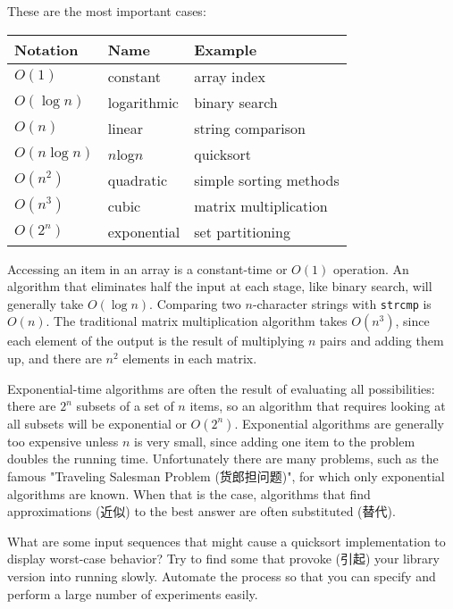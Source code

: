 These are the most important cases:
\begin{center}
\begin{tabular}{lll}
Notation        & Name          & Example                   \\
\hline
$O(1)$          & constant      & array index               \\
$O(\log n)$     & logarithmic   & binary search             \\
$O(n)$          & linear        & string comparison         \\
$O(n\log n)$    & $n$log$n$     & quicksort                 \\
$O(n^2)$        & quadratic     & simple sorting methods    \\
$O(n^3)$        & cubic         & matrix multiplication     \\
$O(2^n)$        & exponential   & set partitioning
\end{tabular}
\end{center}

Accessing an item in an array is a constant-time or $O(1)$ operation. An
algorithm that eliminates half the input at each stage, like binary search,
will generally take $O(\log n)$. Comparing two $n$-character strings with
\verb'strcmp' is $O(n)$. The traditional matrix multiplication algorithm
takes $O(n^3)$, since each element of the output is the result of
multiplying $n$ pairs and adding them up, and there are $n^2$ elements in
each matrix.

Exponential-time algorithms are often the result of evaluating all
possibilities: there are $2^n$ subsets of a set of $n$ items, so an
algorithm that requires looking at all subsets will be exponential or
$O(2^n)$. Exponential algorithms are generally too expensive unless $n$ is
very small, since adding one item to the problem doubles the running time.
Unfortunately there are many problems, such as the famous "Traveling
Salesman Problem (货郎担问题)", for which only exponential algorithms are
known. When that is the case, algorithms that find approximations (近似) to
the best answer are often substituted (替代).

\begin{exercise}
What are some input sequences that might cause a quicksort implementation
to display worst-case behavior? Try to find some that provoke (引起) your
library version into running slowly. Automate the process so that you can
specify and perform a large number of experiments easily.
\end{exercise}

